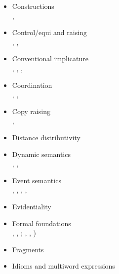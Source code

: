 \documentclass[output=paper,hidelinks]{langscibook}
\begin{document}
\begin{paperappendix}
\begin{itemize}
\item 
  Constructions\\
  \citet{Asudehetal08,asudeh2013constructions}, \citet{asudeh;toivonen14}

\item 
  Control/equi and raising\\
  \citet{Asudeh05cont}, \citet{Haug2013}, \citet[ch.\,15]{DLM:LFG}
  
\item Conventional
  implicature\\
  \citet[ch.\,4]{Asudeh2004}, \citet{potts05}, \citet{arnold;sadler10,arnold;sadler11}, \citet{giorgolo;asudeh12b}
  
\item 
  Coordination\\
  \citet{kehler;ea99}, \citet{asudeh;crouch02-lfg-coord}, \citet[ch.\,16]{DLM:LFG}
  
\item 
  Copy raising\\
  \citet{Asudeh2004,Asudeh12}, \citet{AsudehToivonen2007,AshT:12}

\item 
  Distance distributivity\\ \citet{Przepiorkowski2014,adamp14b,Przepiorkowski2015}

\item Dynamic
  semantics\\
  \citet{crouch;gena99}, \citet{genabith;crouch99}, \citet[ch.\,14]{DLM:LFG}
  
\item 
  Event semantics\\
  \citet{fry05}, \citet{AsudGior12},
  \citet{AshT:12}, \citet{asudeh2013constructions}, \citet{asudeh2014meaning}
  
\item 
  Evidentiality\\ \citet{AsudehToivonen2017}
  
\item Formal foundations\\
  \citet{dalrymple;ea99c}, \citet{dalrymple-etal1999intro}, \citet{dalrymple;ea97b};
  \citet[ch.\,5]{Asudeh2004,Asudeh12} \citet{kokkonidis08}, 
  \citet{andrews2008,andrews10}, \citet{findlay2021})

\item Fragments\\
  \citet[ch.\,11]{Asudeh12}

\item 
  Idioms
  and multiword expressions\\ \citet{findlay2019,findlay2021}
  

\end{itemize}
\end{paperappendix}
\end{document}
